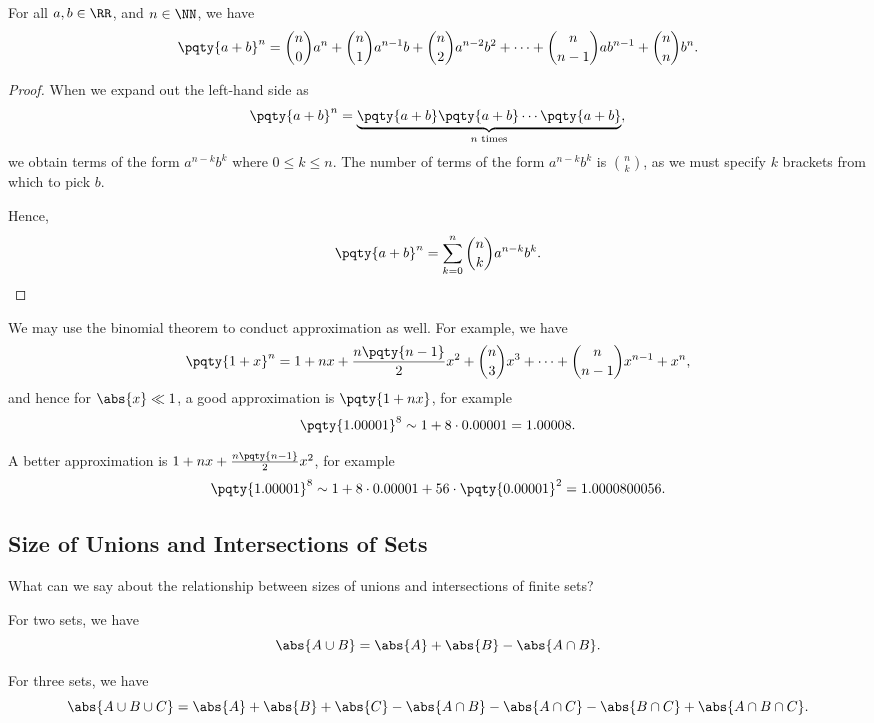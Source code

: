 \begin{theorem}
    For all \(a, b \in \RR\), and \(n \in \NN\), we have
    \[
        \pqty{a + b}^n = \binom{n}{0} a^n + \binom{n}{1} a^{n - 1} b + \binom{n}{2} a^{n - 2} b^2 + \cdots + \binom{n}{n - 1} a b^{n - 1} + \binom{n}{n} b^n.
    \]
\end{theorem}

\begin{proof}
    When we expand out the left-hand side as
    \[
        \pqty{a + b}^n = \underbrace{\pqty{a + b} \pqty{a + b} \cdots \pqty{a + b}}_{n \text{ times}},
    \]
    we obtain terms of the form \(a^{n - k} b^k\) where \(0 \leq k \leq n\). The number of terms of the form \(a^{n - k} b^k\) is \(\binom{n}{k}\), as we must specify \(k\) brackets from which to pick \(b\).

    Hence,
    \[
        \pqty{a + b}^n = \sum_{k = 0}^{n} \binom{n}{k} a^{n - k} b^k.
    \]
\end{proof}

We may use the binomial theorem to conduct approximation as well. For example, we have
\[
    \pqty{1 + x}^n = 1 + nx + \frac{n \pqty{n - 1}}{2} x^2 + \binom{n}{3} x^3 + \cdots + \binom{n}{n - 1} x^{n - 1} + x^n,
\]
and hence for \(\abs{x} \ll 1\), a good approximation is \(\pqty{1 + nx}\), for example
\[
    \pqty{1.00001}^8 \sim 1 + 8 \cdot 0.00001 = 1.00008.
\]

A better approximation is \(1 + nx + \frac{n\pqty{n - 1}}{2}x^2\), for example
\[
    \pqty{1.00001}^8 \sim 1 + 8 \cdot 0.00001 + 56 \cdot \pqty{0.00001}^2 = 1.0000800056.
\]

\subsection{Size of Unions and Intersections of Sets}
\label{sec:size-unions-intersections-sets}

What can we say about the relationship between sizes of unions and intersections of finite sets?

For two sets, we have
\[
    \abs{A \cup B} = \abs{A} + \abs{B} - \abs{A \cap B}.
\]

For three sets, we have
\[
    \abs{A \cup B \cup C} = \abs{A} + \abs{B} + \abs{C} - \abs{A \cap B} - \abs{A \cap C} - \abs{B \cap C} + \abs{A \cap B \cap C}.
\]

